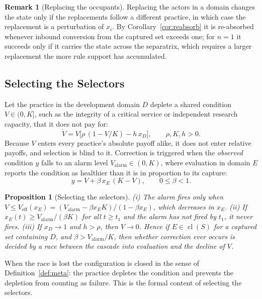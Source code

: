 \documentclass[letterpaper]{article} %
\newtheorem{proposition}{Proposition}
\theoremstyle{definition}
\newtheorem{remark}{Remark}
\newcommand{\cl}{\operatorname{cl}}
\begin{document}
\begin{remark}[Replacing the occupants]\label{rem:occupants}
Replacing the actors in a domain changes the state only if the replacements follow a different practice, in which case the replacement is a perturbation of $x_i$. By Corollary~\ref{cor:reabsorb} it is re-absorbed whenever inbound conversion from the captured set exceeds one; for $n=1$ it succeeds only if it carries the state across the separatrix, which requires a larger replacement the more rule support has accumulated.
\end{remark}

\subsection{Selecting the Selectors}

Let the practice in the development domain $D$ deplete a shared condition $V\in(0,K]$, such as the integrity of a critical service or independent research capacity, that it does not pay for:
\begin{equation}\label{eq:V}
\dot V=V\big[\rho\,(1-V/K)-h\,x_D\big],\qquad \rho,K,h>0.
\end{equation}
Because $V$ enters every practice's absolute payoff alike, it does not enter relative payoffs, and selection is blind to it. Correction is triggered when the \emph{observed} condition $y$ falls to an alarm level $V_{\mathrm{alarm}}\in(0,K)$, where evaluation in domain $E$ reports the condition as healthier than it is in proportion to its capture:
\begin{equation}\label{eq:y}
y=V+\beta\,x_E\,(K-V),\qquad 0\le\beta<1.
\end{equation}

\begin{proposition}[Selecting the selectors]\label{prop:selectors}
(i) The alarm fires only when $V\le V_{\mathrm{eff}}(x_E)=(V_{\mathrm{alarm}}-\beta x_EK)/(1-\beta x_E)$, which decreases in $x_E$. (ii) If $x_E(t)\ge V_{\mathrm{alarm}}/(\beta K)$ for all $t\ge t_1$ and the alarm has not fired by $t_1$, it never fires. (iii) If $x_D\to1$ and $h>\rho$, then $V\to0$. Hence if $E\in\cl(S)$ for a captured set containing $D$, and $\beta>V_{\mathrm{alarm}}/K$, then whether correction ever occurs is decided by a race between the cascade into evaluation and the decline of $V$.
\end{proposition}

When the race is lost the configuration is closed in the sense of Definition~\ref{def:meta}: the practice depletes the condition and prevents the depletion from counting as failure. This is the formal content of selecting the selectors.
\end{document}
